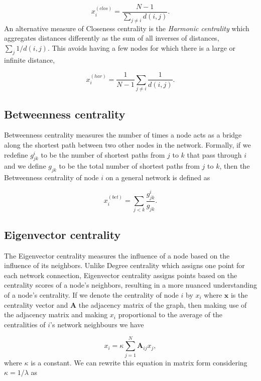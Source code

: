 \begin{equation}
    x_i^{(clos)}= \frac{N-1}{\sum_{j\ne i}^{}d(i,j)}.
\end{equation}
An alternative measure of Closeness centrality is the \textit{Harmonic centrality} which aggregates distances differently as the sum of all inverses
of distances, $\sum_{j}^{}1/d(i,j)$. This avoids having a few nodes for which there is a large or infinite distance,

\begin{equation}
    x_i^{(har)}= \frac{1}{N-1}\sum_{j\ne i}^{}\frac{1}{d(i,j)}.
\end{equation}

\subsection*{Betweenness centrality} Betweenness centrality measures the number of times a node acts as a bridge along the shortest path between two other nodes in the network. Formally, if we redefine $g_{jk}^i$ to be the number of shortest paths from $j$ to $k$ that pass through $i$ and we define $g_{jk}$ to be the total number of shortest paths from $j$ to $k$, then the Betweenness centrality of node $i$ on a general network is defined as

\begin{equation}
    x_i^{(bet)}= \sum_{j<k}^{}\frac{g_{jk}^i}{g_{jk}}.
\end{equation}

\subsection*{Eigenvector centrality} The Eigenvector centrality measures the influence of a node based on the influence of its neighbors. Unlike Degree centrality which assigns one point for each network connection, Eigenvector centrality assigns points based on the centrality scores of a node's neighbors, resulting in a more nuanced understanding of a node's centrality. If we denote the centrality of node $i$ by $x_i$ where $\mathbf{x}$ is the centrality vector and $\mathbf{A}$ the adjacency matrix of the graph, then making use of the adjacency matrix and making $x_i$ proportional to the average of the centralities of $i$’s network neighbours we have

\begin{equation}
\label{eqn:eigc}
    x_i= \kappa\sum_{j=1}^{N}\mathbf{A}_{ij}x_j,
\end{equation}
where $\kappa$ is a constant. We can rewrite this equation in matrix form considering $\kappa=1/\lambda$ as

